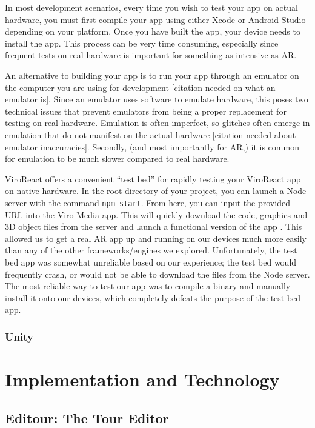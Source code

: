 \documentclass[a4paper, 10pt, american, titlepage]{article}
\begin{document}
In most development scenarios, every time you wish to test your app on actual
hardware, you must first compile your app using either Xcode or Android Studio
depending on your platform. Once you have built the app, your device needs to
install the app. This process can be very time consuming, especially since
frequent tests on real hardware is important for something as intensive as
AR.

An alternative to building your app is to run your app through an emulator on
the computer you are using for development [citation needed on what an emulator
is]. Since an emulator uses software to emulate hardware, this poses two
technical issues that prevent emulators from being a proper replacement for
testing on real hardware.  Emulation is often imperfect, so glitches often
emerge in emulation that do not manifest on the actual hardware [citation
needed about emulator inaccuracies]. Secondly, (and most importantly for AR,)
it is common for emulation to be much slower compared to real hardware.

ViroReact offers a convenient ``test bed'' for rapidly testing your ViroReact
app on native hardware. In the root directory of your project, you can launch
a Node server with the command \texttt{npm start}. From here, you can input
the provided URL into the Viro Media app. This will quickly download the code,
graphics and 3D object files from the server and launch a functional version
of the app \autocite{viro-testbed2019}. This allowed us to get a real AR app
up and running on our devices much more easily than any of the other
frameworks/engines we explored. Unfortunately, the test bed app was somewhat
unreliable based on our experience; the test bed would frequently crash,
or would not be able to download the files from the Node server. The most
reliable way to test our app was to compile a binary and manually install it
onto our devices, which completely defeats the purpose of the test bed app.

\subsubsection{Unity}
\label{sec:unity}

\section{Implementation and Technology}
\label{sec:implementationAndTechnology}

\subsection{Editour: The Tour Editor}
\label{sec:editour}
\end{document}
